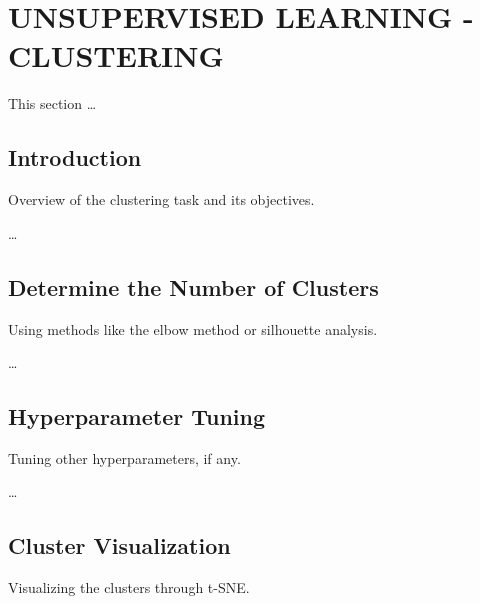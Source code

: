 

\section{UNSUPERVISED LEARNING - CLUSTERING}

    This section \ldots

    \subsection{Introduction}
    
        Overview of the clustering task and its objectives.

        \ldots

    \subsection{Determine the Number of Clusters}
    
        Using methods like the elbow method or silhouette analysis.

        \ldots
        
    \subsection{Hyperparameter Tuning}
    
        Tuning other hyperparameters, if any.

        \ldots
        
    \subsection{Cluster Visualization}
    
        Visualizing the clusters through t-SNE.

